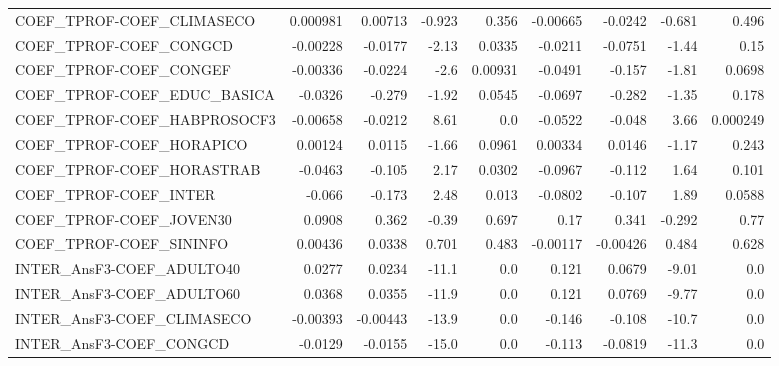 \begin{tabular}{lrrrrrrrr}
COEF\_TPROF-COEF\_CLIMASECO           &    0.000981 &      0.00713 &  -0.923 &    0.356 &   -0.00665 &     -0.0242 &       -0.681 &         0.496 \\
COEF\_TPROF-COEF\_CONGCD              &    -0.00228 &      -0.0177 &   -2.13 &   0.0335 &    -0.0211 &     -0.0751 &        -1.44 &          0.15 \\
COEF\_TPROF-COEF\_CONGEF              &    -0.00336 &      -0.0224 &    -2.6 &  0.00931 &    -0.0491 &      -0.157 &        -1.81 &        0.0698 \\
COEF\_TPROF-COEF\_EDUC\_BASICA         &     -0.0326 &       -0.279 &   -1.92 &   0.0545 &    -0.0697 &      -0.282 &        -1.35 &         0.178 \\
COEF\_TPROF-COEF\_HABPROSOCF3         &    -0.00658 &      -0.0212 &    8.61 &      0.0 &    -0.0522 &      -0.048 &         3.66 &      0.000249 \\
COEF\_TPROF-COEF\_HORAPICO            &     0.00124 &       0.0115 &   -1.66 &   0.0961 &    0.00334 &      0.0146 &        -1.17 &         0.243 \\
COEF\_TPROF-COEF\_HORASTRAB           &     -0.0463 &       -0.105 &    2.17 &   0.0302 &    -0.0967 &      -0.112 &         1.64 &         0.101 \\
COEF\_TPROF-COEF\_INTER               &      -0.066 &       -0.173 &    2.48 &    0.013 &    -0.0802 &      -0.107 &         1.89 &        0.0588 \\
COEF\_TPROF-COEF\_JOVEN30             &      0.0908 &        0.362 &   -0.39 &    0.697 &       0.17 &       0.341 &       -0.292 &          0.77 \\
COEF\_TPROF-COEF\_SININFO             &     0.00436 &       0.0338 &   0.701 &    0.483 &   -0.00117 &    -0.00426 &        0.484 &         0.628 \\
INTER\_AnsF3-COEF\_ADULTO40           &      0.0277 &       0.0234 &   -11.1 &      0.0 &      0.121 &      0.0679 &        -9.01 &           0.0 \\
INTER\_AnsF3-COEF\_ADULTO60           &      0.0368 &       0.0355 &   -11.9 &      0.0 &      0.121 &      0.0769 &        -9.77 &           0.0 \\
INTER\_AnsF3-COEF\_CLIMASECO          &    -0.00393 &     -0.00443 &   -13.9 &      0.0 &     -0.146 &      -0.108 &        -10.7 &           0.0 \\
INTER\_AnsF3-COEF\_CONGCD             &     -0.0129 &      -0.0155 &   -15.0 &      0.0 &     -0.113 &     -0.0819 &        -11.3 &           0.0 \\

\end{tabular}
